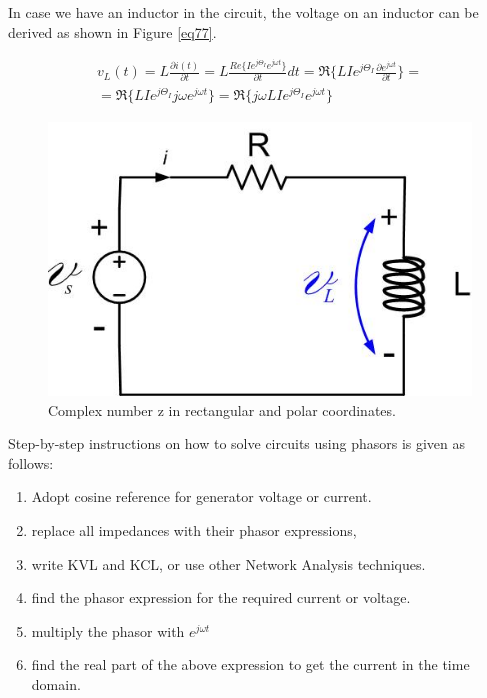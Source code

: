 \documentclass{ximera}
\begin{document}
In case we have an inductor in the circuit, the voltage on an inductor can be derived as shown in Figure \ref{eq77}. 


\begin{eqnarray}
v_L(t) = L \frac{\partial{ i(t)}}{\partial t}  =L  \frac{ Re\{    I e^{j \Theta_I} e^{j \omega t}\}}{\partial t}  dt  = \Re\{  LI e^{j \Theta_I} \frac{ \partial e^{j \omega t}}{\partial t} \} =  \nonumber \\ = \Re\{  LI e^{j  \Theta_I}  j  \omega e^{j \omega t} \} =  \Re \{  j  \omega       LI e^{j  \Theta_I}    e^{j \omega t}   \}      \label{eq77} 
\end{eqnarray}


\begin{figure}[htbp]
\begin{center}
\includegraphics[scale=0.3]{../jpg/RLnew.jpg}
\end{center}
\caption{Complex number z in rectangular and polar coordinates.}
\label{RLcirc}
\end{figure}



 Step-by-step instructions on how to solve circuits using phasors is given as follows:
\begin{enumerate}
\item Adopt cosine reference for generator voltage or current. 
\item replace all impedances with their phasor expressions,
\item write KVL and KCL, or use other Network Analysis techniques.
\item find the phasor expression for the required current or voltage. 
\item multiply the phasor with $e^{j \omega t}$  
\item find the real part of the above expression to get the current in the time domain.
\end{enumerate}
\end{document}
